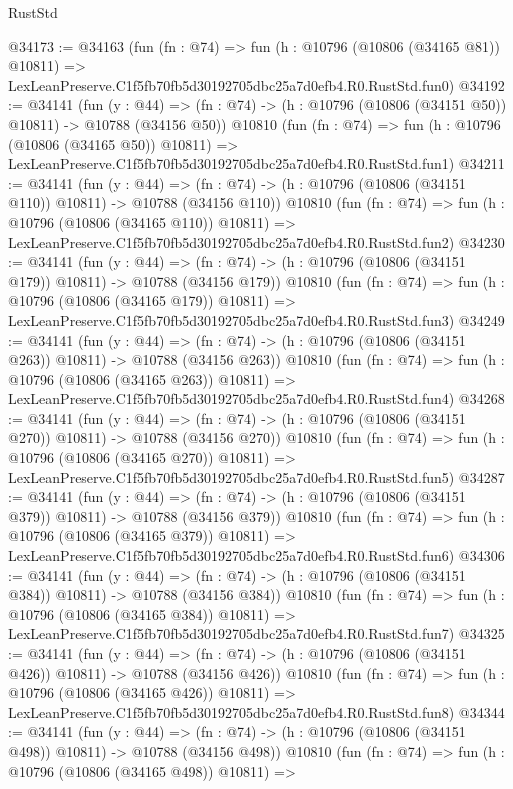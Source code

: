 \begin{lexlean}{RustStd}
\begin{coremodule}
@34173 := @34163
    (fun (fn : @74) =>
    fun (h : @10796 (@10806 (@34165 @81)) @10811) =>
    LexLeanPreserve.C1f5fb70fb5d30192705dbc25a7d0efb4.R0.RustStd.fun0)
@34192 := @34141
    (fun (y : @44) =>
    (fn : @74) -> (h : @10796 (@10806 (@34151 @50)) @10811) -> @10788 (@34156 @50))
    @10810
    (fun (fn : @74) =>
    fun (h : @10796 (@10806 (@34165 @50)) @10811) =>
    LexLeanPreserve.C1f5fb70fb5d30192705dbc25a7d0efb4.R0.RustStd.fun1)
@34211 := @34141
    (fun (y : @44) =>
    (fn : @74) -> (h : @10796 (@10806 (@34151 @110)) @10811) -> @10788 (@34156 @110))
    @10810
    (fun (fn : @74) =>
    fun (h : @10796 (@10806 (@34165 @110)) @10811) =>
    LexLeanPreserve.C1f5fb70fb5d30192705dbc25a7d0efb4.R0.RustStd.fun2)
@34230 := @34141
    (fun (y : @44) =>
    (fn : @74) -> (h : @10796 (@10806 (@34151 @179)) @10811) -> @10788 (@34156 @179))
    @10810
    (fun (fn : @74) =>
    fun (h : @10796 (@10806 (@34165 @179)) @10811) =>
    LexLeanPreserve.C1f5fb70fb5d30192705dbc25a7d0efb4.R0.RustStd.fun3)
@34249 := @34141
    (fun (y : @44) =>
    (fn : @74) -> (h : @10796 (@10806 (@34151 @263)) @10811) -> @10788 (@34156 @263))
    @10810
    (fun (fn : @74) =>
    fun (h : @10796 (@10806 (@34165 @263)) @10811) =>
    LexLeanPreserve.C1f5fb70fb5d30192705dbc25a7d0efb4.R0.RustStd.fun4)
@34268 := @34141
    (fun (y : @44) =>
    (fn : @74) -> (h : @10796 (@10806 (@34151 @270)) @10811) -> @10788 (@34156 @270))
    @10810
    (fun (fn : @74) =>
    fun (h : @10796 (@10806 (@34165 @270)) @10811) =>
    LexLeanPreserve.C1f5fb70fb5d30192705dbc25a7d0efb4.R0.RustStd.fun5)
@34287 := @34141
    (fun (y : @44) =>
    (fn : @74) -> (h : @10796 (@10806 (@34151 @379)) @10811) -> @10788 (@34156 @379))
    @10810
    (fun (fn : @74) =>
    fun (h : @10796 (@10806 (@34165 @379)) @10811) =>
    LexLeanPreserve.C1f5fb70fb5d30192705dbc25a7d0efb4.R0.RustStd.fun6)
@34306 := @34141
    (fun (y : @44) =>
    (fn : @74) -> (h : @10796 (@10806 (@34151 @384)) @10811) -> @10788 (@34156 @384))
    @10810
    (fun (fn : @74) =>
    fun (h : @10796 (@10806 (@34165 @384)) @10811) =>
    LexLeanPreserve.C1f5fb70fb5d30192705dbc25a7d0efb4.R0.RustStd.fun7)
@34325 := @34141
    (fun (y : @44) =>
    (fn : @74) -> (h : @10796 (@10806 (@34151 @426)) @10811) -> @10788 (@34156 @426))
    @10810
    (fun (fn : @74) =>
    fun (h : @10796 (@10806 (@34165 @426)) @10811) =>
    LexLeanPreserve.C1f5fb70fb5d30192705dbc25a7d0efb4.R0.RustStd.fun8)
@34344 := @34141
    (fun (y : @44) =>
    (fn : @74) -> (h : @10796 (@10806 (@34151 @498)) @10811) -> @10788 (@34156 @498))
    @10810
    (fun (fn : @74) =>
    fun (h : @10796 (@10806 (@34165 @498)) @10811) =>

\end{coremodule}
\end{lexlean}
